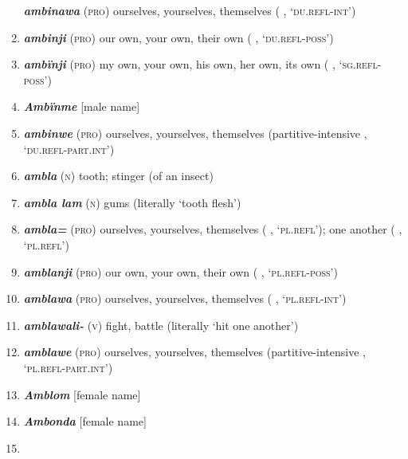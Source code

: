 \begin{enumerate}[noitemsep, label={}, align=left, widest=190, labelsep=1ex,leftmargin=*,itemindent=-10pt]
\textbf{\textit{ambinawa}} (\textsc{pro}) ourselves, yourselves, themselves (   \linebreak {}, ‘\textsc{du.refl-int}’) \item 
\textbf{\textit{ambinji}} (\textsc{pro}) our own, your own, their own (  , ‘\textsc{du.refl-poss}’) \item 
\textbf{\textit{ambïnji}} (\textsc{pro}) my own, your own, his own, her own, its own (  , ‘\textsc{sg.refl-poss}’) \item 
\textbf{\textit{Ambïnme}} [male name] \item 
\textbf{\textit{ambinwe}} (\textsc{pro}) ourselves, yourselves, themselves (partitive-intensive  \linebreak {} , ‘\textsc{du.refl-part.int}’) \item 
\textbf{\textit{ambla}} (\textsc{n}) tooth; stinger (of an insect) \item 
\textbf{\textit{ambla lam}} (\textsc{n}) gums (literally ‘tooth flesh’) \item 
\textbf{\textit{ambla=}} (\textsc{pro}) ourselves, yourselves, themselves (  , \linebreak ‘\textsc{pl.refl}’); one another (  , ‘\textsc{pl.refl}’) \item 
\textbf{\textit{amblanji}} (\textsc{pro}) our own, your own, their own (  , ‘\textsc{pl.refl-poss}’) \item 
\textbf{\textit{amblawa}} (\textsc{pro}) ourselves, yourselves, themselves (   , ‘\textsc{pl.refl-int}’) \item 
\textbf{\textit{amblawali-}} (\textsc{v}) fight, battle (literally ‘hit one another’) \item 
\textbf{\textit{amblawe}} (\textsc{pro}) ourselves, yourselves, themselves (partitive-intensive  \linebreak {} , ‘\textsc{pl.refl-part.int}’) \item 
\textbf{\textit{Amblom}} [female name] \item 
\textbf{\textit{Ambonda}} [female name] \item 

\end{enumerate}

